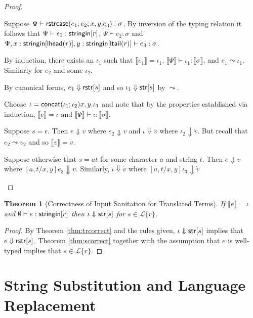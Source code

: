 \documentclass[12pt]{article}
\newcommand{\todo}[1]{{\color{red} #1}}
\newtheorem{thm}{Theorem}
\theoremstyle{definition}
\newcommand{\Lagr}{\mathcal{L}}
\newcommand{\lang}[1]{\Lagr\{#1\}}
\newcommand{\sistr}[1]{{\sf rstr}[#1]}   \newcommand{\rstr}[1]{{\sf rstr}[#1]} %
\newcommand{\strin}[1]{\sistr{#1}}
\newcommand{\stringin}[1]{{\sf stringin}[#1]}
\renewcommand{\tstr}[1]{{{\sf str}[#1]}}
\newcommand{\tconcat}[2]{{\sf concat}(#1;#2)} \newcommand{\concat}[2]{{\sf concat}(#1;#2)} %
\newcommand{\sctx}{\Psi} %
\newcommand{\strcase}[3]{ {\sf rstrcase}(#1; #2; #3)}
\newcommand{\lhead}[1]{ {\sf lhead}(#1) }
\newcommand{\ltail}[1]{ {\sf ltail}(#1) }
\newcommand{\trden}[1]{\llbracket #1 \rrbracket} %
\newcommand{\treduces}{ \Downarrow }
\newcommand{\sreduces}{ \Downarrow }
\begin{document}
\begin{proof}
\begin{itemize}[label=$ $, itemsep=1ex]
Suppose $\sctx \vdash \strcase{e_1}{e_2}{x,y.e_3} : \sigma$.
By inversion of the typing relation it follows that
$\sctx \vdash e_1 : \stringin{r}$, $\sctx \vdash e_2 : \sigma$ and $\sctx, x : \stringin{\lhead{r}}, y : \stringin{\ltail{r}} \vdash e_3 : \sigma$.

By induction, there exists an $\iota_1$ such that $\trden{e_1} = \iota_1$,
$\trden{\sctx} \vdash \iota_1 : \trden{\sigma}$, and $e_1 \leadsto \iota_1$.
Similarly for $e_2$ and some $\iota_2$.

By canonical forms, $e_1 \sreduces \rstr{s}$ and so $\iota_1 \treduces \tstr{s}$ by $\leadsto$.

Choose $\iota = \tconcat{\iota_1}{\iota_2}{x,y.\iota_3}$ \todo{and note that by the properties established via induction,
$\trden{e} = \iota$ and $\trden{\sctx} \vdash \iota : \trden{\sigma}$.}

Suppose $s = \epsilon$. Then $e \sreduces v$ where $e_2 \sreduces v$
and $\iota \treduces \dot{v}$ where $\iota_2 \treduces \dot{v}$.
But recall that $e_2 \leadsto v_2$ and so $\trden{v} = \dot{v}$.

Suppose otherwise that $s = at$ for some character $a$ and string $t$.
Then $e \sreduces v$ where $[a, t / x, y] e_3 \sreduces v$.
Similarly, $\iota \treduces \dot{v}$ where $[a, t / x, y] \iota_3 \treduces \dot{v}$

\end{itemize}
\end{proof}

\begin{thm}[Correctness of Input Sanitation for Translated Terms]\label{thm:main}
  If $\trden{e} = \iota$ and $\emptyset \vdash e : \stringin{r}$ then $\iota \sreduces \tstr{s}$
  for $s \in \lang{r}$.
\end{thm}
\begin{proof}
  By Theorem \ref{thm:trcorrect} and the rules given, $\iota \sreduces \tstr{s}$ implies that $e \sreduces \strin{s}$.
  Theorem \ref{thm:scorrect} together with the assumption that $e$ is well-typed implies that $s \in \lang{r}$.
\end{proof}



\section{String Substitution and Language Replacement}
\end{document}
